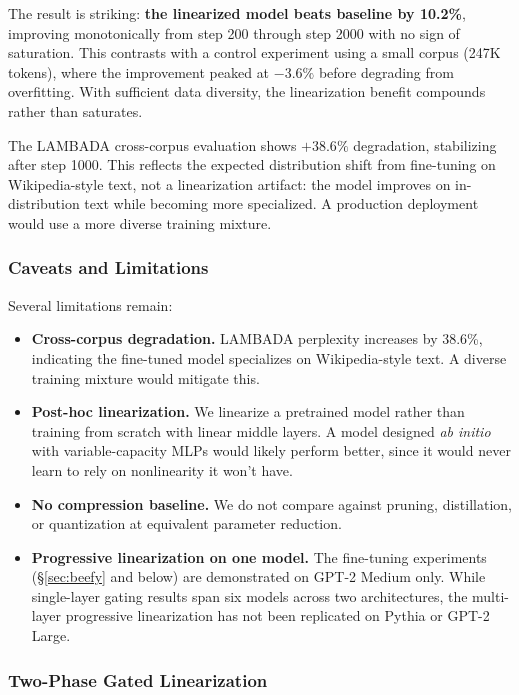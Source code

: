 \documentclass[11pt]{article}
\begin{document}
The result is striking: \textbf{the linearized model beats baseline by 10.2\%}, improving monotonically from step 200 through step 2000 with no sign of saturation. This contrasts with a control experiment using a small corpus (247K tokens), where the improvement peaked at $-3.6\%$ before degrading from overfitting. With sufficient data diversity, the linearization benefit compounds rather than saturates.

The LAMBADA cross-corpus evaluation shows $+38.6\%$ degradation, stabilizing after step 1000. This reflects the expected distribution shift from fine-tuning on Wikipedia-style text, not a linearization artifact: the model improves on in-distribution text while becoming more specialized. A production deployment would use a more diverse training mixture.

\subsubsection{Caveats and Limitations}

Several limitations remain:

\begin{itemize}
    \item \textbf{Cross-corpus degradation.} LAMBADA perplexity increases by 38.6\%, indicating the fine-tuned model specializes on Wikipedia-style text. A diverse training mixture would mitigate this.
    \item \textbf{Post-hoc linearization.} We linearize a pretrained model rather than training from scratch with linear middle layers. A model designed \textit{ab initio} with variable-capacity MLPs would likely perform better, since it would never learn to rely on nonlinearity it won't have.
    \item \textbf{No compression baseline.} We do not compare against pruning, distillation, or quantization at equivalent parameter reduction.
    \item \textbf{Progressive linearization on one model.} The fine-tuning experiments (\S\ref{sec:beefy} and below) are demonstrated on GPT-2 Medium only. While single-layer gating results span six models across two architectures, the multi-layer progressive linearization has not been replicated on Pythia or GPT-2 Large.
\end{itemize}

\subsubsection{Two-Phase Gated Linearization}
\end{document}
